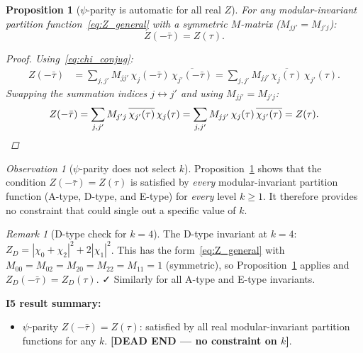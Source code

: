 \documentclass[11pt,a4paper]{article}
\newtheorem{proposition}{Proposition}
\theoremstyle{definition}
\theoremstyle{remark}
\newtheorem{remark}{Remark}
\newtheorem{observation}{Observation}
\begin{document}
\begin{proposition}[$\psi$-parity is automatic for all real $Z$]
  \label{prop:psi_parity_automatic}
  For any modular-invariant partition function~\eqref{eq:Z_general}
  with a symmetric $M$-matrix ($M_{jj'} = M_{j'j}$):
  \begin{equation}
    Z(-\bar\tau) = Z(\tau).
  \end{equation}
  \begin{proof}
    Using~\eqref{eq:chi_conjug}:
    \begin{align}
      Z(-\bar\tau)
      &= \sum_{j,j'} M_{jj'}\,\chi_j(-\bar\tau)\,\overline{\chi_{j'}(-\bar\tau)}
       = \sum_{j,j'} M_{jj'}\,\overline{\chi_j(\tau)}\,\chi_{j'}(\tau).
    \end{align}
    Swapping the summation indices $j \leftrightarrow j'$ and using
    $M_{jj'} = M_{j'j}$:
    \begin{equation}
      Z(-\bar\tau)
      = \sum_{j,j'} M_{j'j}\,\overline{\chi_{j'}(\tau)}\,\chi_j(\tau)
      = \sum_{j,j'} M_{jj'}\,\chi_j(\tau)\,\overline{\chi_{j'}(\tau)}
      = Z(\tau). \qedhere
    \end{equation}
  \end{proof}
\end{proposition}

\begin{observation}[$\psi$-parity does not select $k$]
  \label{obs:I5_dead}
  Proposition~\ref{prop:psi_parity_automatic} shows that the condition
  $Z(-\bar\tau) = Z(\tau)$ is satisfied by \emph{every} modular-invariant
  partition function (A-type, D-type, and E-type) for \emph{every}
  level $k \geq 1$.  It therefore provides no constraint that could
  single out a specific value of $k$.
\end{observation}

\begin{remark}[D-type check for $k = 4$]
  The D-type invariant at $k = 4$:
  $Z_D = |\chi_0 + \chi_2|^2 + 2|\chi_1|^2$.
  This has the form~\eqref{eq:Z_general} with
  $M_{00} = M_{02} = M_{20} = M_{22} = M_{11} = 1$ (symmetric), so
  Proposition~\ref{prop:psi_parity_automatic} applies and
  $Z_D(-\bar\tau) = Z_D(\tau)$. ✓
  Similarly for all A-type and E-type invariants.
\end{remark}

\textbf{I5 result summary:}
\begin{itemize}
  \item $\psi$-parity $Z(-\bar\tau) = Z(\tau)$: satisfied by all real
    modular-invariant partition functions for any $k$.
    \textbf{[DEAD END — no constraint on $k$]}.
\end{itemize}
\end{document}
